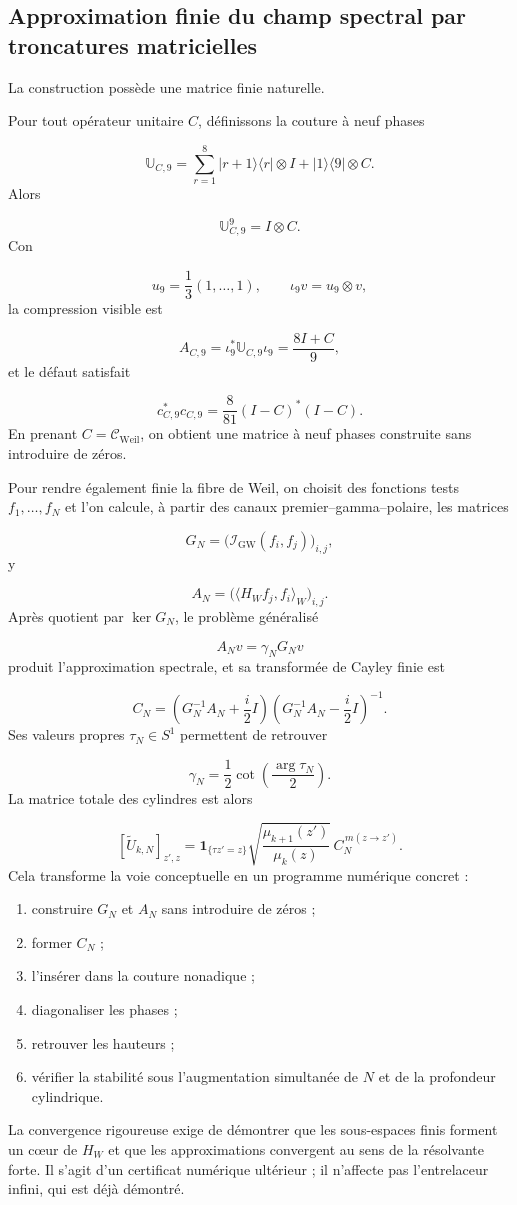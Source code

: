 \subsection{Approximation finie du champ spectral par troncatures matricielles}
La construction possède une matrice finie naturelle.\par
Pour tout opérateur unitaire \(C\), définissons la couture à neuf phases\par
\[
\mathbb U_{C,9}
=
\sum_{r=1}^{8}
|r+1\rangle\langle r|\otimes I
+
|1\rangle\langle9|\otimes C.
\]
Alors\par
\[
\mathbb U_{C,9}^9
=
I\otimes C.
\]
Con\par
\[
u_9=\frac1{3}(1,\ldots,1),
\qquad
\iota_9v=u_9\otimes v,
\]
la compression visible est\par
\[
A_{C,9}
=
\iota_9^*\mathbb U_{C,9}\iota_9
=
\frac{8I+C}{9},
\]
et le défaut satisfait\par
\[
c_{C,9}^*c_{C,9}
=
\frac{8}{81}
(I-C)^*(I-C).
\]
En prenant \(C=\mathcal C_{\mathrm{Weil}}\), on obtient une matrice à neuf phases construite sans introduire de zéros.\par
Pour rendre également finie la fibre de Weil, on choisit des fonctions tests \(f_1,\ldots,f_N\) et l'on calcule, à partir des canaux premier–gamma–polaire, les matrices\par
\[
G_N
=
\bigl(
\mathscr I_{\mathrm{GW}}(f_i,f_j)
\bigr)_{i,j},
\]
y\par
\[
A_N
=
\bigl(
\langle H_Wf_j,f_i\rangle_W
\bigr)_{i,j}.
\]
Après quotient par \(\ker G_N\), le problème généralisé\par
\[
A_Nv=\gamma_NG_Nv
\]
produit l'approximation spectrale, et sa transformée de Cayley finie est\par
\[
C_N
=
\left(
G_N^{-1}A_N+\frac{i}{2}I
\right)
\left(
G_N^{-1}A_N-\frac{i}{2}I
\right)^{-1}.
\]
Ses valeurs propres \(\tau_N\in S^1\) permettent de retrouver\par
\[
\gamma_N
=
\frac12
\cot\left(
\frac{\arg\tau_N}{2}
\right).
\]
La matrice totale des cylindres est alors\par
\[
[\widetilde U_{k,N}]_{z',z}
=
\mathbf1_{\{\tau z'=z\}}
\sqrt{\frac{\mu_{k+1}(z')}{\mu_k(z)}}
\,C_N^{\,m(z\to z')}.
\]
Cela transforme la voie conceptuelle en un programme numérique concret :\par
\begin{enumerate}
\item construire \(G_N\) et \(A_N\) sans introduire de zéros ;
\item former \(C_N\) ;
\item l'insérer dans la couture nonadique ;
\item diagonaliser les phases ;
\item retrouver les hauteurs ;
\item vérifier la stabilité sous l'augmentation simultanée de \(N\) et de la profondeur cylindrique.
\end{enumerate}
La convergence rigoureuse exige de démontrer que les sous-espaces finis forment un cœur de \(H_W\) et que les approximations convergent au sens de la résolvante forte. Il s'agit d'un certificat numérique ultérieur ; il n'affecte pas l'entrelaceur infini, qui est déjà démontré.\par
{}
